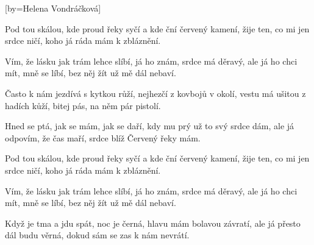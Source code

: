 [by={Helena Vondráčková}]

\beginverse{}
Pod tou skálou, kde proud řeky syčí
a kde ční červený kamení, 
žije ten, co mi jen srdce ničí, 
koho já ráda mám k zbláznění.
\endverse{}

\beginverse{}
\chordsoff{}
Vím, že lásku jak trám lehce slíbí,
já ho znám, srdce má děravý, 
ale já ho chci mít, mně se líbí, 
bez něj žít už mě dál nebaví.
\chordson{}
\endverse{}

\beginverse{}
\chordsoff{}
Často k nám jezdívá s kytkou růží,
nejhezčí z kovbojů v okolí, 
vestu má ušitou z hadích kůží, 
bitej pás, na něm pár pistolí.
\chordson{}
\endverse{}

\beginverse{}
\chordsoff{}
Hned se ptá, jak se mám, jak se daří,
kdy mu prý už to svý srdce dám, 
ale já odpovím, že čas maří, 
srdce blíž Červený řeky mám.
\chordson{}
\endverse{}

\beginverse{}
\chordsoff{}
Pod tou skálou, kde proud řeky syčí
a kde ční červený kamení, 
žije ten, co mi jen srdce ničí, 
koho já ráda mám k zbláznění.
\chordson{}
\endverse{}

\beginverse{}
\chordsoff{}
Vím, že lásku jak trám lehce slíbí,
já ho znám, srdce má děravý, 
ale já ho chci mít, mně se líbí, 
bez něj žít už mě dál nebaví.
\chordson{}
\endverse{}

\beginverse{}
\chordsoff{}
Když je tma a jdu spát, noc je černá,
hlavu mám bolavou závratí, 
ale já přesto dál budu věrná, 
dokud sám se zas k nám nevrátí.
\chordson{}
\endverse{}

\endsong{}

